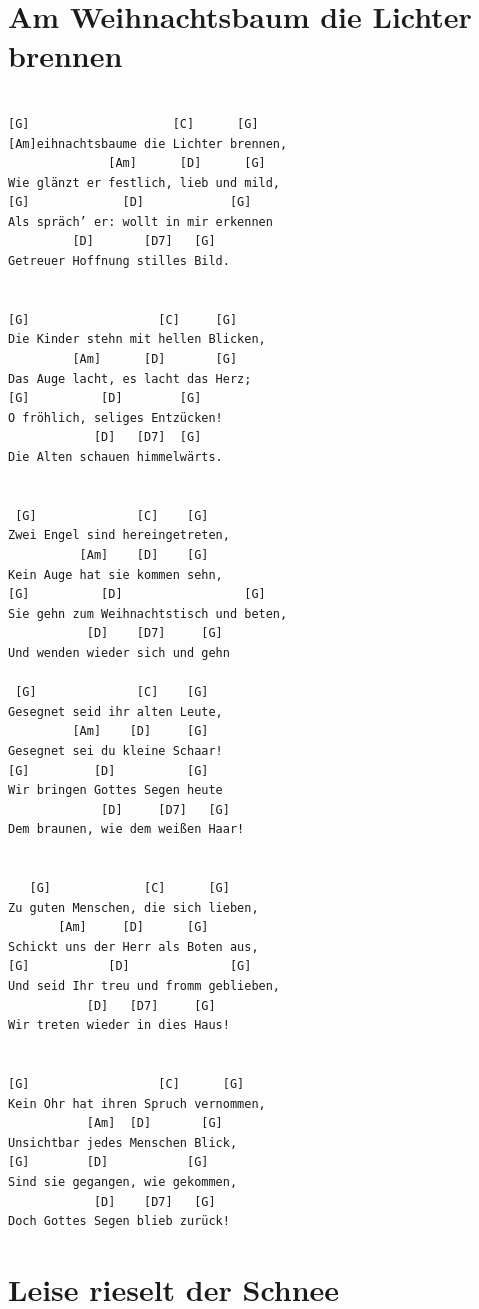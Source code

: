 \documentclass[
]{book}
\let\stdsection\section
\renewcommand\section{\clearpage\stdsection}
\begin{document}
\hypertarget{weihnachten-am-weihnachtsbaume-die-lichter-brennen}{%
\section{Am Weihnachtsbaum die Lichter brennen}\label{weihnachten-am-weihnachtsbaume-die-lichter-brennen}}

\begin{verbatim}

[G]                    [C]      [G]
[Am]eihnachtsbaume die Lichter brennen,
              [Am]      [D]      [G]
Wie glänzt er festlich, lieb und mild,
[G]             [D]            [G]
Als spräch’ er: wollt in mir erkennen
         [D]       [D7]   [G]
Getreuer Hoffnung stilles Bild.


[G]                  [C]     [G]
Die Kinder stehn mit hellen Blicken,
         [Am]      [D]       [G]
Das Auge lacht, es lacht das Herz;
[G]          [D]        [G]
O fröhlich, seliges Entzücken!
            [D]   [D7]  [G]
Die Alten schauen himmelwärts.


 [G]              [C]    [G]
Zwei Engel sind hereingetreten,
          [Am]    [D]    [G]
Kein Auge hat sie kommen sehn,
[G]          [D]                 [G]
Sie gehn zum Weihnachtstisch und beten,
           [D]    [D7]     [G]
Und wenden wieder sich und gehn
 
 [G]              [C]    [G]
Gesegnet seid ihr alten Leute,
         [Am]    [D]     [G]
Gesegnet sei du kleine Schaar!
[G]         [D]          [G]
Wir bringen Gottes Segen heute
             [D]     [D7]   [G]
Dem braunen, wie dem weißen Haar!


   [G]             [C]      [G]
Zu guten Menschen, die sich lieben,
       [Am]     [D]      [G]
Schickt uns der Herr als Boten aus,
[G]           [D]              [G]
Und seid Ihr treu und fromm geblieben,
           [D]   [D7]     [G]
Wir treten wieder in dies Haus!
 

[G]                  [C]      [G]
Kein Ohr hat ihren Spruch vernommen,
           [Am]  [D]       [G]
Unsichtbar jedes Menschen Blick,
[G]        [D]           [G]
Sind sie gegangen, wie gekommen,
            [D]    [D7]   [G]
Doch Gottes Segen blieb zurück!
\end{verbatim}

\hypertarget{weihnachten-leise-rieselt-der-schnee}{%
\section{Leise rieselt der Schnee}\label{weihnachten-leise-rieselt-der-schnee}}
\end{document}
